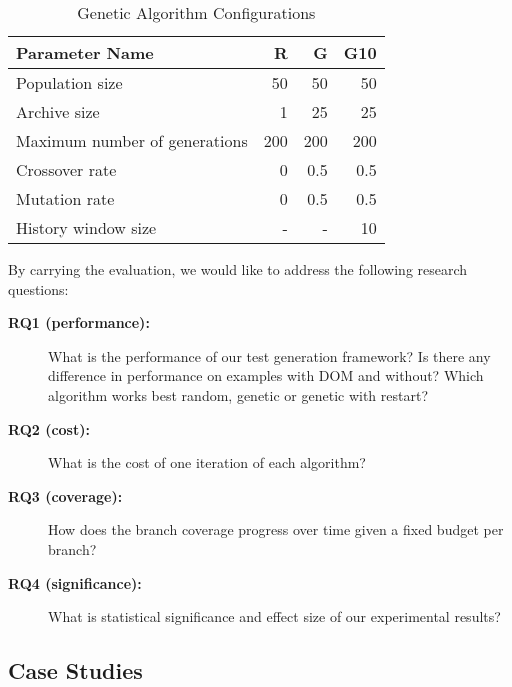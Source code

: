 \documentclass[sigconf]{acmart}
\begin{document}
\begin{table}
  \caption{Genetic Algorithm Configurations}
  \label{tbl.gen.config}
    \scriptsize
  \begin{tabular}{l|r|r|r}
    \toprule
    \textbf{Parameter Name} & \textbf{R} & \textbf{G} & \textbf{G10} \\
    \hline
    Population size                   & 50  & 50  & 50  \\
    Archive size                      & 1   & 25  & 25  \\
    Maximum number of generations     & 200 & 200 & 200 \\
    Crossover rate                    & 0   & 0.5 & 0.5 \\
    Mutation rate                     & 0   & 0.5 & 0.5 \\
    History window size               & -   & -   & 10  \\
    \bottomrule
  \end{tabular}
\end{table}

By carrying the evaluation, we would like to address the following research questions:
\begin{description}
\item[\textbf{RQ1 (performance):}] What is the performance of our test generation framework? Is there any difference in performance on examples with DOM and without?  Which algorithm works best random, genetic or genetic with restart?
\item[\textbf{RQ2 (cost):}] What is the cost of one iteration of each algorithm?
\item[\textbf{RQ3 (coverage):}] How does the branch coverage progress over time given a fixed budget per branch?
\item[\textbf{RQ4 (significance):}] What is statistical significance and effect size of our experimental results? 
\end{description}


\subsection{Case Studies}
\label{sub.sec.case.studies}
\end{document}

